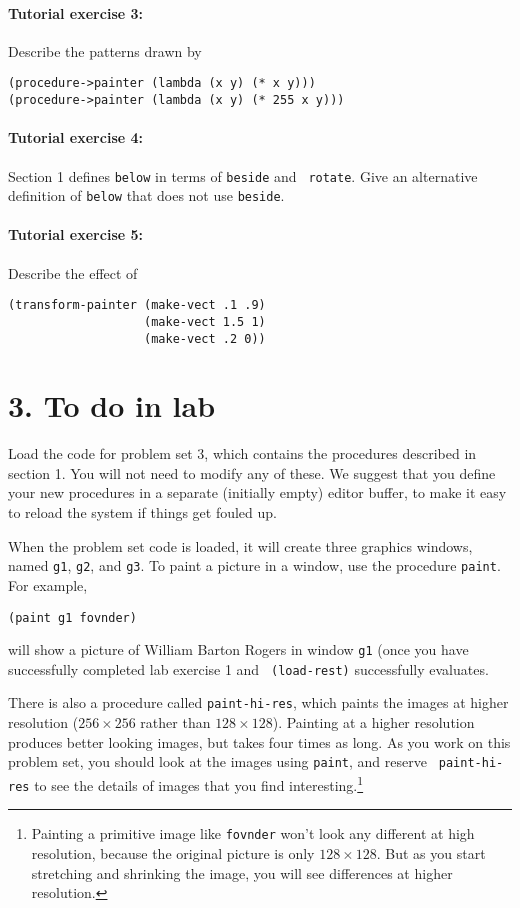 \paragraph{Tutorial exercise 3:}
Describe the patterns drawn by

\begin{verbatim}
(procedure->painter (lambda (x y) (* x y)))
(procedure->painter (lambda (x y) (* 255 x y)))
\end{verbatim}

\paragraph{Tutorial exercise 4:}
Section 1 defines {\tt below} in terms of {\tt beside} and {\tt
rotate}.  Give an alternative definition of {\tt below} that does not
use {\tt beside}.

\paragraph{Tutorial exercise 5:}
Describe the effect of

\begin{verbatim}
(transform-painter (make-vect .1 .9)
                   (make-vect 1.5 1)
                   (make-vect .2 0))
\end{verbatim}

\section{3. To do in lab}

Load the code for problem set 3, which contains the procedures
described in section 1.  You will not need to modify any of these.  We
suggest that you define your new procedures in a separate (initially
empty) editor buffer, to make it easy to reload the system if things
get fouled up.

When the problem set code is loaded, it will create three graphics windows,
named {\tt g1}, {\tt g2}, and {\tt g3}.  To paint a picture in a
window, use the procedure {\tt paint}.  For example,

\begin{verbatim}
(paint g1 fovnder)
\end{verbatim}

\noindent
will show a picture of William Barton Rogers in window {\tt g1}
(once you have successfully completed lab exercise 1 and {\tt
(load-rest)} successfully evaluates.

There is also a procedure called {\tt paint-hi-res}, which paints the
images at higher resolution ($256 \times 256$ rather than $128 \times
128$).  Painting at a higher resolution produces better looking
images, but takes four times as long.  As you work on this problem
set, you should look at the images using {\tt paint}, and reserve {\tt
paint-hi-res} to see the details of images that you find
interesting.\footnote{Painting a primitive image like {\tt fovnder} won't
look any different at high resolution, because the original picture is
only $128 \times 128$.  But as you start stretching and shrinking the
image, you will see differences at higher resolution.}


